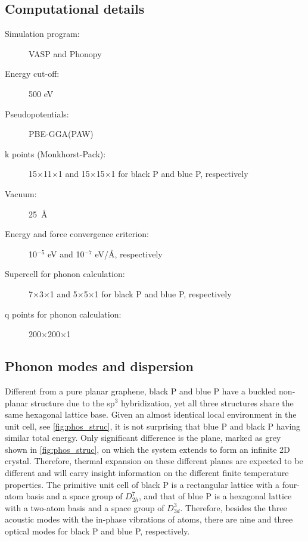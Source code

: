 \subsection{Computational details}

\begin{footnotesize}
\begin{description}
\item[Simulation program:] VASP and Phonopy\cite{phonopy_code}
\item[Energy cut-off:] 500 eV
\item[Pseudopotentials:] PBE-GGA(PAW)
\item[k points (Monkhorst-Pack):] 15$\times$11$\times$1 and 15$\times$15$\times$1 for black P and blue P, respectively 
\item[Vacuum:] 25~\AA
\item[Energy and force convergence criterion:] 10$^{-5}$ eV and 10$^{-7}$ eV/\AA, respectively
\item[Supercell for phonon calculation:] 7$\times$3$\times$1 and 5$\times$5$\times$1 for black P and blue P, respectively
\item[q points for phonon calculation:] 200$\times$200$\times$1
\end{description}
\end{footnotesize}

\subsection{Phonon modes and dispersion \label{sec:pho_phos}}

Different from a pure planar graphene, black P and blue P have a buckled non-planar structure due to the sp$^3$ hybridization, yet all three structures share the same hexagonal lattice base. Given an almost identical local environment in the unit cell, see \autoref{fig:phos_struc}, it is not surprising that blue P and black P having similar total energy. Only significant difference is the plane, marked as grey shown in \autoref{fig:phos_struc}, on which the system extends to form an infinite 2D crystal. Therefore, thermal expansion on these different planes are expected to be different and will carry insight information on the different finite temperature properties. The primitive unit cell of black P is a rectangular lattice with a four-atom basis and a space group of $D_{2h}^7$, and that of blue P is a hexagonal lattice with a two-atom basis and a space group of  $D_{3d}^3$. Therefore, besides the three acoustic modes with the in-phase vibrations of atoms, there are nine and three optical modes for black P and blue P, respectively. 

